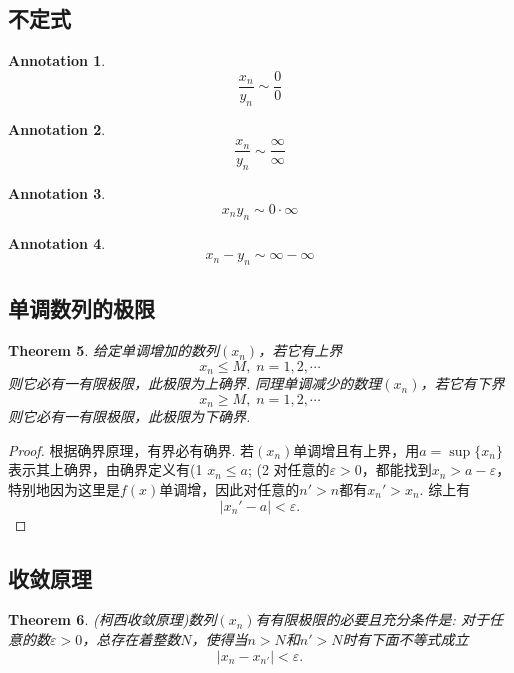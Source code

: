 \documentclass{article}
\newtheorem{theorem}{Theorem}[section]
\newtheorem{annotation}[theorem]{Annotation}
\begin{document}
\subsection{不定式}

\begin{annotation}
$$
\frac{x_n}{y_n} \sim \frac{0}{0}
$$
\end{annotation}

\begin{annotation}
$$
\frac{x_n}{y_n} \sim \frac{\infty}{\infty}
$$
\end{annotation}

\begin{annotation}
$$
x_n y_n \sim  0 \cdot \infty
$$
\end{annotation}

\begin{annotation}
$$
x_n - y_n \sim \infty - \infty
$$
\end{annotation}

\subsection{单调数列的极限}

\begin{theorem}
\rm 给定单调增加的数列$(x_n)$，若它有上界
$$
x_n \leq M,\; n = 1,2,\cdots
$$
则它必有一有限极限，此极限为上确界. 同理单调减少的数理$(x_n)$，若它有下界
$$
x_n \geq M, \; n = 1,2,\cdots
$$
则它必有一有限极限，此极限为下确界.
\end{theorem}

\begin{proof}
根据{\color{red}确界原理}，有界必有确界. 若$(x_n)$单调增且有上界，用$a =\sup\{x_n\}$表示其上确界，由确界定义有{\color{blue}(1} $x_n \leq a$; {\color{blue}(2} 对任意的$\varepsilon > 0$，都能找到$x_n > a-\varepsilon$，特别地因为这里是$f(x)$单调增，因此对任意的$n'> n$都有$x_n' > x_n$. 综上有
$$
|x_n' -a| < \varepsilon.
$$
\end{proof}

\subsection{收敛原理}

\begin{theorem}
\rm {\color{red} (柯西收敛原理)}数列$(x_n)$有有限极限的必要且充分条件是: 对于任意的数$\varepsilon > 0$，总存在着整数$N$，使得当$n > N$和$n' > N$时有下面不等式成立
$$
|x_n - x_{n'}| < \varepsilon.
$$
\end{theorem}
\end{document}
